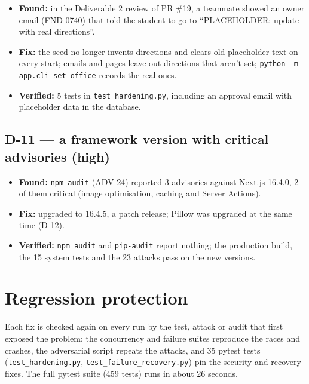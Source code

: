 \begin{itemize}
\item \textbf{Found:} in the Deliverable 2 review of PR \#19, a teammate showed an owner email (FND-0740) that told the student to go to “PLACEHOLDER: update with real directions”.
\item \textbf{Fix:} the seed no longer invents directions and clears old placeholder text on every start; emails and pages leave out directions that aren’t set; \texttt{python -\allowbreak{}m app.\allowbreak{}cli set-\allowbreak{}office} records the real ones.
\item \textbf{Verified:} 5 tests in \texttt{test\_\allowbreak{}hardening.\allowbreak{}py}, including an approval email with placeholder data in the database.
\end{itemize}

\subsection{D-11 — a framework version with critical advisories (high)}

\begin{itemize}
\item \textbf{Found:} \texttt{npm audit} (ADV-24) reported 3 advisories against Next.js 16.4.0, 2 of them critical (image optimisation, caching and Server Actions).
\item \textbf{Fix:} upgraded to 16.4.5, a patch release; Pillow was upgraded at the same time (D-12).
\item \textbf{Verified:} \texttt{npm audit} and \texttt{pip-\allowbreak{}audit} report nothing; the production build, the 15 system tests and the 23 attacks pass on the new versions.
\end{itemize}

\section{Regression protection}

Each fix is checked again on every run by the test, attack or audit that first exposed the problem: the concurrency and failure suites reproduce the races and crashes, the adversarial script repeats the attacks, and 35 pytest tests (\texttt{test\_\allowbreak{}hardening.\allowbreak{}py}, \texttt{test\_\allowbreak{}failure\_\allowbreak{}recovery.\allowbreak{}py}) pin the security and recovery fixes. The full pytest suite (459 tests) runs in about 26 seconds.


